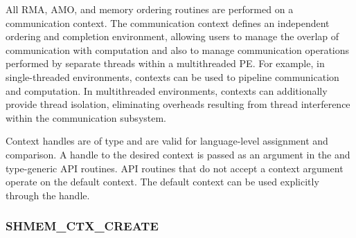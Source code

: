 \color{ForestGreen}

All \openshmem RMA, AMO, and memory ordering routines are
performed on a communication context.  The communication context defines an
independent ordering and completion environment, allowing users to manage the
overlap of communication with computation and also to manage communication
operations performed by separate threads within a multithreaded \ac{PE}.  For
example, in single-threaded environments, contexts can be used to pipeline
communication and computation.  In multithreaded environments, contexts can
additionally provide thread isolation, eliminating overheads resulting from
thread interference within the communication subsystem.

Context handles are of type  and are valid for
language-level assignment and comparison.  A handle to the desired context is
passed as an argument in the \Cstd {} and type-generic API
routines.  API routines that do not accept a context argument operate on the
default context.  The default context can be used explicitly through the
 handle.

\subsubsection{\textbf{SHMEM\_CTX\_CREATE}}
\label{subsec:shmem_ctx_create}

